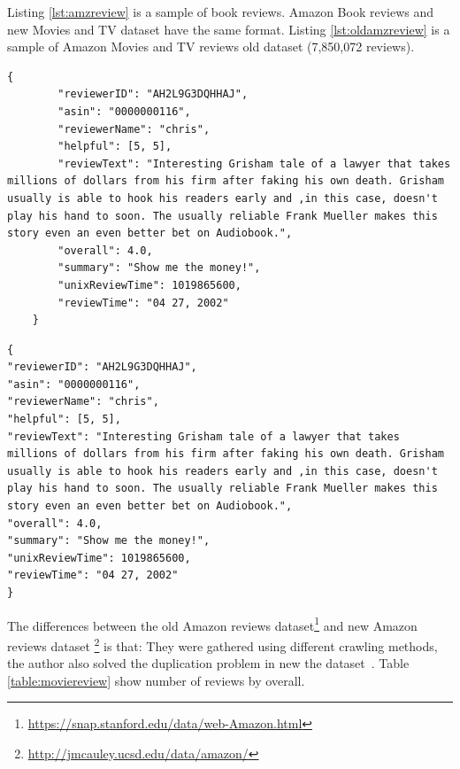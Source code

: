 Listing \ref{lst:amzreview} is a sample of book reviews. 
Amazon Book reviews and new Movies and TV dataset have the same format. Listing \ref{lst:oldamzreview} is a sample of Amazon Movies and TV reviews old dataset (7,850,072 reviews). 

\begin{lstlisting}[caption={Amazon reviews sample},label={lst:amzreview}]
    {
        "reviewerID": "AH2L9G3DQHHAJ",
        "asin": "0000000116",
        "reviewerName": "chris",
        "helpful": [5, 5],
        "reviewText": "Interesting Grisham tale of a lawyer that takes millions of dollars from his firm after faking his own death. Grisham usually is able to hook his readers early and ,in this case, doesn't play his hand to soon. The usually reliable Frank Mueller makes this story even an even better bet on Audiobook.",
        "overall": 4.0,
        "summary": "Show me the money!",
        "unixReviewTime": 1019865600,
        "reviewTime": "04 27, 2002"
    }
\end{lstlisting}

\begin{lstlisting}[caption={Old Amazon reviews sample},label={lst:oldamzreview}]
{
"reviewerID": "AH2L9G3DQHHAJ",
"asin": "0000000116",
"reviewerName": "chris",
"helpful": [5, 5],
"reviewText": "Interesting Grisham tale of a lawyer that takes millions of dollars from his firm after faking his own death. Grisham usually is able to hook his readers early and ,in this case, doesn't play his hand to soon. The usually reliable Frank Mueller makes this story even an even better bet on Audiobook.",
"overall": 4.0,
"summary": "Show me the money!",
"unixReviewTime": 1019865600,
"reviewTime": "04 27, 2002"
}
\end{lstlisting}

The differences between the old Amazon reviews dataset\footnote{\url{https://snap.stanford.edu/data/web-Amazon.html}} and new Amazon reviews dataset \footnote{\url{http://jmcauley.ucsd.edu/data/amazon/}} is that: 
They were gathered using different crawling methods, the author also solved the duplication problem in new the dataset~\cite{amazon-reviews}.
Table \ref{table:moviereview} show number of reviews by overall.

